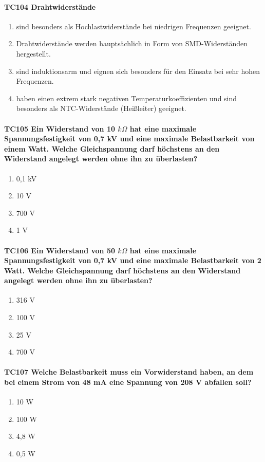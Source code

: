 \documentclass[8pt]{article}
\begin{document}
\begin{enumerate}
\begin{enumerate}[nolistsep,label=\Alph*]
\paragraph*{TC104 Drahtwiderstände}
\begin{enumerate}[nolistsep,label=\Alph*]
\item sind besonders als Hochlastwiderstände bei niedrigen Frequenzen geeignet.
\item Drahtwiderstände werden hauptsächlich in Form von SMD-Widerständen hergestellt.
\item sind induktionsarm und eignen sich besonders für den Einsatz bei sehr hohen Frequenzen.
\item haben einen extrem stark negativen Temperaturkoeffizienten und sind besonders als NTC-Widerstände (Heißleiter) geeignet.
\end{enumerate}

\paragraph*{TC105 Ein Widerstand von 10 $k\Omega$ hat eine maximale Spannungsfestigkeit von 0,7 kV und eine maximale Belastbarkeit von einem Watt. Welche Gleichspannung darf höchstens an den Widerstand angelegt werden ohne ihn zu überlasten?}
\begin{enumerate}[nolistsep,label=\Alph*]
\item 0,1 kV
\item 10 V
\item 700 V
\item 1 V
\end{enumerate}

\paragraph*{TC106 Ein Widerstand von 50 $k\Omega$ hat eine maximale Spannungsfestigkeit von 0,7 kV und eine maximale Belastbarkeit von 2 Watt. Welche Gleichspannung darf höchstens an den Widerstand angelegt werden ohne ihn zu überlasten?}
\begin{enumerate}[nolistsep,label=\Alph*]
\item 316 V
\item 100 V
\item 25 V
\item 700 V
\end{enumerate}

\paragraph*{TC107 Welche Belastbarkeit muss ein Vorwiderstand haben, an dem bei einem Strom von 48 mA eine Spannung von 208 V abfallen soll?}
\begin{enumerate}[nolistsep,label=\Alph*]
\item 10 W
\item 100 W
\item 4,8 W
\item 0,5 W
\end{enumerate}


\end{enumerate}
\end{enumerate}
\end{document}
